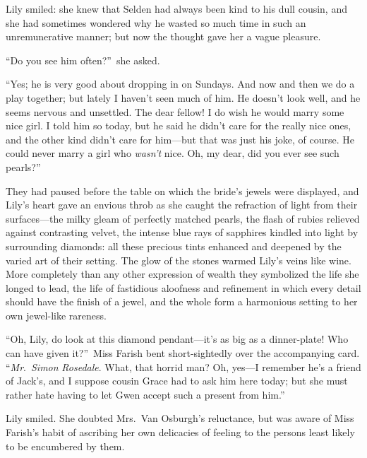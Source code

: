\documentclass[12pt,a4paper]{book}
\begin{document}
Lily smiled: she knew that Selden had always been kind to his
dull cousin, and she had sometimes wondered why he wasted so much
time in such an unremunerative manner; but now the thought gave
her a vague pleasure.





``Do you see him often?''\ she asked.





``Yes; he is very good about dropping in on Sundays. And now and
then we do a play together; but lately I haven't seen much of
him. He doesn't look well, and he seems nervous and unsettled. 
The dear fellow! I do wish he would marry some nice girl. I told
him so today, but he said he didn't care for the really nice
ones, and the other kind didn't care for him---but that was just
his joke, of course. He could never marry a girl who \textit{wasn't} nice. 
Oh, my dear, did you ever see such pearls?''





They had paused before the table on which the bride's jewels were
displayed, and Lily's heart gave an envious throb as she caught
the refraction of light from their surfaces---the milky gleam of
perfectly matched pearls, the flash of rubies relieved against
contrasting velvet, the intense blue rays of sapphires kindled
into light by surrounding diamonds: all these precious tints
enhanced and deepened by the varied art of their setting. The
glow of the stones warmed Lily's veins like wine. More completely
than any other expression of wealth they symbolized the life she
longed to lead, the life of fastidious aloofness and refinement
in which every detail should have the finish of a jewel, and the
whole form a harmonious setting to her own jewel-like rareness.





``Oh, Lily, do look at this diamond pendant---it's as big as a
dinner-plate! Who can have given it?''\ Miss Farish bent
short-sightedly over the accompanying card. ``\textit{Mr}.\ \textit{Simon} \textit{Rosedale}. 
What, that horrid man? Oh, yes---I remember he's a friend of
Jack's, and I suppose cousin Grace had to ask him here today; but
she must rather hate having to let Gwen accept such a present
from him.''





Lily smiled. She doubted Mrs.\ Van Osburgh's reluctance, but was
aware of Miss Farish's habit of ascribing her own delicacies of
feeling to the persons least likely to be encumbered by them.
\end{document}
